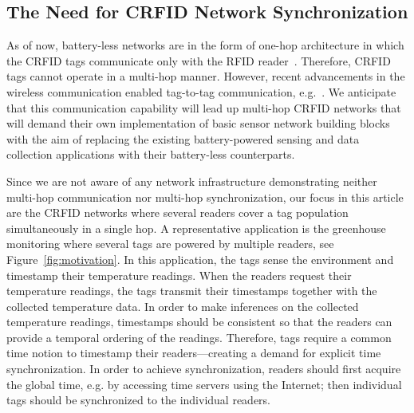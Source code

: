 \documentclass[10pt,journal,compsoc]{IEEEtran}
\begin{document}
\subsection{The Need for CRFID Network Synchronization}

As of now, battery-less networks are in the form of one-hop architecture in which the CRFID tags communicate only with the RFID reader~\cite{wisp,booksmith2013,wisent:2016}. Therefore, CRFID tags cannot operate in a multi-hop manner. However, recent advancements in the wireless communication enabled tag-to-tag communication, e.g.~\cite{liu2013ambient}.  We anticipate that this communication capability will lead up multi-hop CRFID networks that will demand their own implementation of basic sensor network building blocks~\cite{levis:tinyos} with the aim of replacing the existing battery-powered sensing and data collection applications with their battery-less counterparts. 

Since we are not aware of any network infrastructure demonstrating neither multi-hop communication nor multi-hop synchronization, our focus in this article are the CRFID networks where several readers cover a tag population simultaneously in a single hop. A representative application is the greenhouse monitoring where several tags are powered by multiple readers, see Figure~\ref{fig:motivation}. In this application, the tags sense the environment and timestamp their temperature readings. When the readers request their temperature readings, the tags transmit their timestamps together with the collected temperature data. In order to make inferences on the collected temperature readings, timestamps should be consistent so that the readers can provide a temporal ordering of the readings. Therefore, tags require a common time notion to timestamp their readers---creating a demand for explicit time synchronization. In order to achieve synchronization, readers should first acquire the global time, e.g. by accessing time servers using the Internet; then individual tags should be synchronized to the individual readers.

\end{document}
